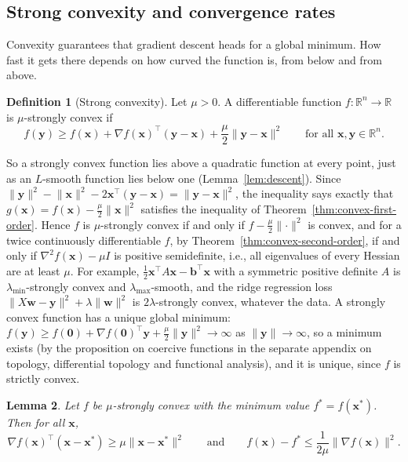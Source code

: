 \documentclass[11pt]{article}
\newcommand{\norm}[1]{\lVert #1 \rVert}
\theoremstyle{definition}
\newtheorem{definition}{Definition}[section]
\theoremstyle{plain}
\newtheorem{lemma}[definition]{Lemma}
\theoremstyle{remark}
\begin{document}
\subsection{Strong convexity and convergence rates}\label{sec:rates}

Convexity guarantees that gradient descent heads for a global minimum. How fast it gets there depends on how curved the function is, from below and from above.

\begin{definition}[Strong convexity]\label{def:strongly-convex}
    Let $\mu > 0$. A differentiable function $f: \mathbb{R}^n \to \mathbb{R}$ is $\mu$-strongly convex if
    \[f(\mathbf{y}) \geq f(\mathbf{x}) + \nabla f(\mathbf{x})^\top(\mathbf{y} - \mathbf{x}) + \frac{\mu}{2}\norm{\mathbf{y} - \mathbf{x}}^2 \qquad \text{for all } \mathbf{x}, \mathbf{y} \in \mathbb{R}^n.\]
\end{definition}

So a strongly convex function lies above a quadratic function at every point, just as an $L$-smooth function lies below one (Lemma~\ref{lem:descent}). Since $\norm{\mathbf{y}}^2 - \norm{\mathbf{x}}^2 - 2\mathbf{x}^\top(\mathbf{y} - \mathbf{x}) = \norm{\mathbf{y} - \mathbf{x}}^2$, the inequality says exactly that $g(\mathbf{x}) = f(\mathbf{x}) - \frac{\mu}{2}\norm{\mathbf{x}}^2$ satisfies the inequality of Theorem~\ref{thm:convex-first-order}. Hence $f$ is $\mu$-strongly convex if and only if $f - \frac{\mu}{2}\norm{\cdot}^2$ is convex, and for a twice continuously differentiable $f$, by Theorem~\ref{thm:convex-second-order}, if and only if $\nabla^2 f(\mathbf{x}) - \mu I$ is positive semidefinite, i.e., all eigenvalues of every Hessian are at least $\mu$. For example, $\frac{1}{2}\mathbf{x}^\top A\mathbf{x} - \mathbf{b}^\top\mathbf{x}$ with a symmetric positive definite $A$ is $\lambda_{\min}$-strongly convex and $\lambda_{\max}$-smooth, and the ridge regression loss $\norm{X\mathbf{w} - \mathbf{y}}^2 + \lambda\norm{\mathbf{w}}^2$ is $2\lambda$-strongly convex, whatever the data. A strongly convex function has a unique global minimum: $f(\mathbf{y}) \geq f(\mathbf{0}) + \nabla f(\mathbf{0})^\top\mathbf{y} + \frac{\mu}{2}\norm{\mathbf{y}}^2 \to \infty$ as $\norm{\mathbf{y}} \to \infty$, so a minimum exists (by the proposition on coercive functions in the separate appendix on topology, differential topology and functional analysis), and it is unique, since $f$ is strictly convex.

\begin{lemma}\label{lem:pl}
    Let $f$ be $\mu$-strongly convex with the minimum value $f^* = f(\mathbf{x}^*)$. Then for all $\mathbf{x}$,
    \[\nabla f(\mathbf{x})^\top(\mathbf{x} - \mathbf{x}^*) \geq \mu\norm{\mathbf{x} - \mathbf{x}^*}^2 \qquad \text{and} \qquad f(\mathbf{x}) - f^* \leq \frac{1}{2\mu}\norm{\nabla f(\mathbf{x})}^2.\]
\end{lemma}
\end{document}
